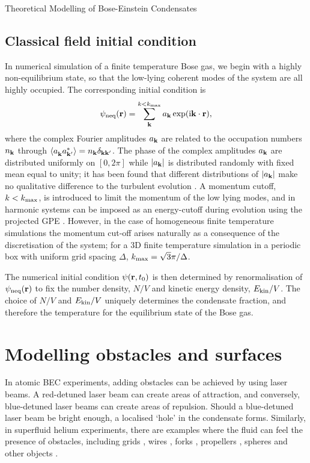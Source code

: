 \begin{chapter}{\label{cha:theoretical_model}Theoretical Modelling of Bose-Einstein Condensates}
\subsection{\label{section:cfieldinitcond} Classical field initial condition}
	In numerical simulation of a finite temperature Bose gas, we begin with a highly non-equilibrium state, so that the low-lying coherent modes of the system are all highly occupied. The corresponding initial condition is
	\begin{equation}
	\psi_{\rm neq}({\bf r}) = \sum \limits_{\bf k}^{k<k_{\rm max}} a_{\bf k} \exp (\mathrm{i}{\bf k}\cdot{\bf r}),
	\label{eq:cFieldIC}
	\end{equation}
	where the complex Fourier amplitudes $a_{\bf k}$ are related to the occupation numbers $n_{\bf k}$ through $\braket{a_{\bf k}^{\,}a_{\bf k'}^*} = n_{\bf k}\delta_{\bf kk'}$. The phase of the complex amplitudes $a_{\bf k}$ are distributed uniformly on $[0,2\pi]$ while $|a_{\bf k}|$ is distributed randomly with fixed mean equal to unity; it has been found that different distributions of $|a_{\bf k}|$ make no qualitative difference to the turbulent evolution \cite{PhysRevA.66.013603}. A momentum cutoff, $k<k_{\rm max}$, is introduced to limit the momentum of the low lying modes, and in harmonic systems can be imposed as an energy-cutoff during evolution using the projected GPE \cite{PhysRevLett.87.160402}. However, in the case of homogeneous finite temperature simulations the momentum cut-off arises naturally as a consequence of the discretisation of the system; for a 3D finite temperature simulation in a periodic box with uniform grid spacing $\Delta$, $k_{\rm max}=\sqrt{3} \pi / \Delta$.

	The numerical initial condition $\psi({\bf r},t_0)$ is then determined by renormalisation of $\psi_{\rm neq}({\bf r})$ to fix the number density, $N/V$ and kinetic energy density, $E_{\rm kin}/V$. The choice of $N/V$ and $E_{\rm kin}/V$ uniquely determines the condensate fraction, and therefore the temperature for the equilibrium state of the Bose gas.

\section{\label{section:potentials}Modelling obstacles and surfaces}
In atomic BEC experiments, adding obstacles can be achieved by using laser beams. A red-detuned laser beam can create areas of attraction, and conversely, blue-detuned laser beams can create areas of repulsion. Should a blue-detuned laser beam be bright enough, a localised `hole' in the condensate forms. Similarly, in superfluid helium experiments, there are examples where the fluid can feel the presence of obstacles, including grids \cite{Davis2000,brad05}, wires \cite{Guenault1986,Bradley2011,Fisher2001}, forks \cite{Blaauwgeers2007,Bradley2012}, propellers \cite{Tabeling,Salort}, spheres \cite{Schoepe1995} and other objects \cite{VinenSkrbek2008}.


\end{chapter}
